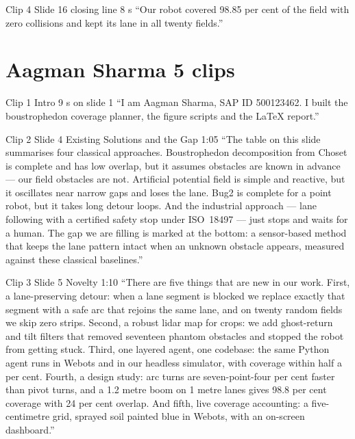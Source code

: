 \documentclass[11pt,a4paper]{article}
\begin{document}
\begin{clipbox}{Clip 4 \textbullet{} Slide 16 closing line \textbullet{} 8 s}
``Our robot covered 98.85 per cent of the field with zero collisions and kept its lane in all twenty fields.''
\end{clipbox}

\section*{\color{brand}Aagman Sharma \textbullet{} 5 clips}

\begin{clipbox}{Clip 1 \textbullet{} Intro \textbullet{} 9 s \textbullet{} on slide 1}
``I am Aagman Sharma, SAP ID 500123462. I built the boustrophedon coverage planner, the figure scripts and the LaTeX report.''
\end{clipbox}

\begin{clipbox}{Clip 2 \textbullet{} Slide 4 Existing Solutions and the Gap \textbullet{} 1:05}
``The table on this slide summarises four classical approaches. Boustrophedon decomposition from Choset is complete and has low overlap, but it assumes obstacles are known in advance --- our field obstacles are not. Artificial potential field is simple and reactive, but it oscillates near narrow gaps and loses the lane. Bug2 is complete for a point robot, but it takes long detour loops. And the industrial approach --- lane following with a certified safety stop under ISO~18497 --- just stops and waits for a human. The gap we are filling is marked at the bottom: a sensor-based method that keeps the lane pattern intact when an unknown obstacle appears, measured against these classical baselines.''
\end{clipbox}

\begin{clipbox}{Clip 3 \textbullet{} Slide 5 Novelty \textbullet{} 1:10}
``There are five things that are new in our work. First, a lane-preserving detour: when a lane segment is blocked we replace exactly that segment with a safe arc that rejoins the same lane, and on twenty random fields we skip zero strips. Second, a robust lidar map for crops: we add ghost-return and tilt filters that removed seventeen phantom obstacles and stopped the robot from getting stuck. Third, one layered agent, one codebase: the same Python agent runs in Webots and in our headless simulator, with coverage within half a per cent. Fourth, a design study: arc turns are seven-point-four per cent faster than pivot turns, and a 1.2 metre boom on 1 metre lanes gives 98.8 per cent coverage with 24 per cent overlap. And fifth, live coverage accounting: a five-centimetre grid, sprayed soil painted blue in Webots, with an on-screen dashboard.''
\end{clipbox}
\end{document}
